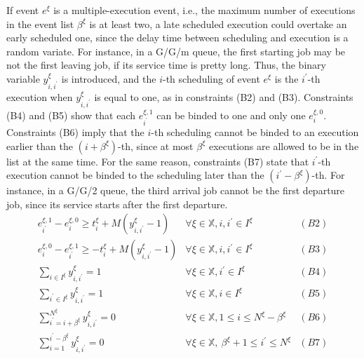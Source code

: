 \documentclass[]{interact}
\theoremstyle{plain}%
\theoremstyle{definition}
\theoremstyle{remark}
\begin{document}
If event $e^{\xi}$ is a multiple-execution event, i.e., the maximum number of executions in the event list $\beta^{\xi}$ is at least two, a late scheduled execution could overtake an early scheduled one, since the delay time between scheduling and execution is a random variate. For instance, in a G/G/m queue, the first starting job may be not the first leaving job, if its service time is pretty long. Thus, the binary variable $y^{\xi}_{i,i^{'}}$ is introduced, and the $i$-th scheduling of event $e^{\xi}$ is the $i^{'}$-th execution when $y^{\xi}_{i,i^{'}}$ is equal to one, as in constraints (B2) and (B3). Constraints (B4) and (B5) show that each $e^{\xi,1}_{i^{'}}$ can be binded to one and only one $e^{\xi,0}_{i}$. Constraints (B6) imply that the $i$-th scheduling cannot be binded to an execution earlier than the $(i+\beta^{\xi})$-th, since at most $\beta^{\xi}$ executions are allowed to be in the list at the same time. For the same reason, constraints (B7) state that $i^{'}$-th execution cannot be binded to the scheduling later than the $(i^{'}-\beta^{\xi})$-th. For instance, in a G/G/2 queue, the third arrival job cannot be the first departure job, since its service starts after the first departure.
\begin{eqnarray}
e^{\xi,1}_{i^{'}} - e^{\xi,0}_{i} \ge t^{\xi}_{i} +M(y^{\xi}_{i,i^{'}}-1) & \forall \xi\in\mathbb{X}, i, i ^{'}\in I^{\xi}&(B2)\nonumber\\
e^{\xi,0}_{i} - e^{\xi,1}_{i^{'}}  \ge -t^{\xi}_{i} +M(y^{\xi}_{i,i^{'}}-1) &  \forall \xi\in\mathbb{X}, i, i ^{'}\in I^{\xi}&(B3)\nonumber\\
\sum_{i\in I^{\xi}} y^{\xi}_{i,i^{'}} = 1										&  \forall \xi\in\mathbb{X}, i ^{'}\in I^{\xi} &(B4)\nonumber\\
\sum_{i^{'}\in I^{\xi}} y^{\xi}_{i,i^{'}} = 1 									& \forall \xi\in\mathbb{X}, i \in I^{\xi}&(B5)\nonumber\\
\sum_{i^{'}=i+\beta^{\xi}}^{N^{\xi}} y^{\xi}_{i,i^{'}}=0					&  \forall \xi\in\mathbb{X}, 1\le i\le N^{\xi}-\beta^{\xi}&(B6)\nonumber\\
\sum_{i=1}^{i^{'}-\beta^{\xi}} y^{\xi}_{i,i^{'}}=0							& \forall \xi\in\mathbb{X},\ \beta^{\xi}+1\le i^{'} \le N^{\xi}&(B7)\nonumber
\end{eqnarray}
\end{document}
